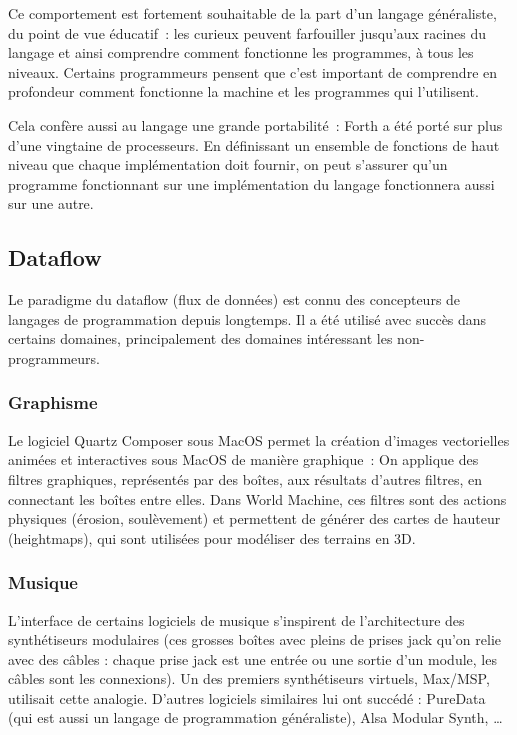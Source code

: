 \documentclass{article}
\begin{document}
Ce comportement est fortement souhaitable de la part d'un langage généraliste, du point de vue éducatif~: les curieux peuvent farfouiller
jusqu'aux racines du langage et ainsi comprendre comment fonctionne les programmes, à tous les niveaux. Certains programmeurs pensent que
c'est important de comprendre en profondeur comment fonctionne la machine et les programmes qui l'utilisent\cite{coders-at-work}.

Cela confère aussi au langage une grande portabilité~: Forth a été porté sur plus d'une vingtaine de processeurs\cite{forth-history}. En définissant un ensemble
de fonctions de haut niveau que chaque implémentation doit fournir, on peut s'assurer qu'un programme fonctionnant sur une implémentation du
langage fonctionnera aussi sur une autre.

\subsection{Dataflow}

Le paradigme du dataflow\cite{vanroy-paradigms} (flux de données) est connu des concepteurs de langages de programmation depuis longtemps. Il a été utilisé avec
succès dans certains domaines, principalement des domaines intéressant les non-programmeurs.

\subsubsection{Graphisme}

Le logiciel Quartz Composer sous MacOS permet la création d'images vectorielles animées et interactives sous MacOS de manière graphique~: On
applique des filtres graphiques, représentés par des boîtes, aux résultats d'autres filtres, en connectant les boîtes entre elles. Dans
World Machine, ces filtres sont des actions physiques (érosion, soulèvement) et permettent de générer des cartes de hauteur (heightmaps),
qui sont utilisées pour modéliser des terrains en 3D.

\subsubsection{Musique}

L'interface de certains logiciels de musique s'inspirent de l'architecture des synthétiseurs modulaires\cite{modular-synth} (ces grosses
boîtes avec pleins de prises jack qu'on relie avec des câbles : chaque prise jack est une entrée ou une sortie d'un module, les câbles sont
les connexions). Un des premiers synthétiseurs virtuels, Max/MSP, utilisait cette analogie. D'autres logiciels similaires lui ont succédé :
PureData (qui est aussi un langage de programmation généraliste), Alsa Modular Synth, \dots
\end{document}
